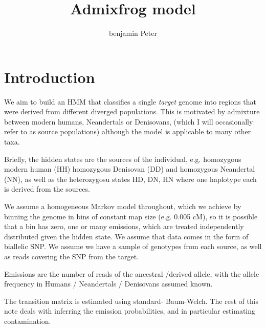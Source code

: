 \documentclass[10pt,a4paper]{article}
\author{benjamin Peter}
\title{Admixfrog model}
\begin{document}
	\maketitle
\section*{Introduction}

	We aim to build an HMM that classifies a single \emph{target} genome into regions that were derived from different diverged populations. This is motivated by admixture between modern humans, Neandertals or Denisovans, (which I will occasionally refer to as source populations) although the model is applicable to many other taxa. 
	
	Briefly, the hidden states are the sources of the individual, e.g. homozygous modern human (HH) homozygous Denisovan (DD) and homozygous Neandertal (NN), as well as the heterozygosu states HD, DN, HN where one haplotype each is derived from the sources.
	
	We assume a homogeneous Markov model throughout, which we achieve by binning the genome in bins  of constant map size (e.g. 0.005 cM), so it is possible that a bin has zero, one or many emissions, which are treated independently distributed given the hidden state. We assume that data comes in the form of biallelic SNP. We assume we have a sample of genotypes from each source, as well as reads covering the SNP from the target.
	
	Emissions are the number of reads of the ancestral /derived allele, with the allele frequency in Humans / Neandertals / Denisovans assumed known.
	
	The transition matrix is estimated using standard- Baum-Welch. The rest of this note deals with inferring the emission probabilities, and in particular estimating contamination.
\end{document}
